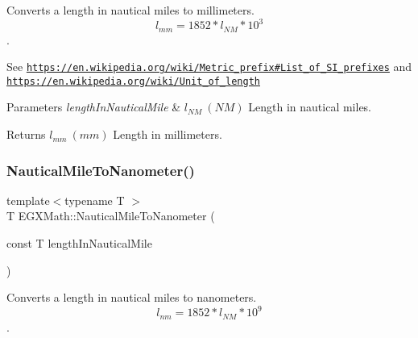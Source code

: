 Converts a length in nautical miles to millimeters. \[ l_{mm}=1852 * l_{NM} * 10^{3} \]. 

See \href{https://en.wikipedia.org/wiki/Metric_prefix#List_of_SI_prefixes}{\tt https\+://en.\+wikipedia.\+org/wiki/\+Metric\+\_\+prefix\#\+List\+\_\+of\+\_\+\+S\+I\+\_\+prefixes} and \href{https://en.wikipedia.org/wiki/Unit_of_length}{\tt https\+://en.\+wikipedia.\+org/wiki/\+Unit\+\_\+of\+\_\+length} 
\begin{DoxyParams}{Parameters}
{\em length\+In\+Nautical\+Mile} & $ l_{NM}\ (NM)$ Length in nautical miles. \\
\hline
\end{DoxyParams}
\begin{DoxyReturn}{Returns}
$ l_{mm}\ (mm)$ Length in millimeters. 
\end{DoxyReturn}
\mbox{\label{group___e_g_x_math-_conversions-_length_conversions-_non-_s_i-_nautical_mile-_s_i_ga914f8e21cf415b90729304b19eec1f05}} 
\subsubsection{\texorpdfstring{Nautical\+Mile\+To\+Nanometer()}{NauticalMileToNanometer()}}
{\footnotesize\ttfamily template$<$typename T $>$ \\
T E\+G\+X\+Math\+::\+Nautical\+Mile\+To\+Nanometer (\begin{DoxyParamCaption}\item[{const T}]{length\+In\+Nautical\+Mile }\end{DoxyParamCaption})}



Converts a length in nautical miles to nanometers. \[ l_{nm}=1852 * l_{NM} * 10^{9} \]. 

